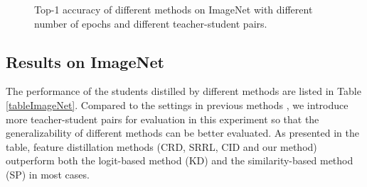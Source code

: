 \documentclass{article}
\begin{document}
\begin{figure}[t]
    \centering
	\hspace{3mm}
	\caption{Top-1 accuracy of different methods on ImageNet with different number of epochs and different teacher-student pairs.}
	\label{converge}
\end{figure}
\subsection{Results on ImageNet}
The performance of the students distilled by different methods are listed in Table \ref{tableImageNet}. Compared to the settings in previous methods \cite{crd,srrl,cid}, we introduce more teacher-student pairs for evaluation in this experiment so that the generalizability of different methods can be better evaluated. As presented in the table, feature distillation methods (CRD, SRRL, CID and our method) outperform both the logit-based method (KD) and the similarity-based method (SP) in most cases. 
\end{document}

